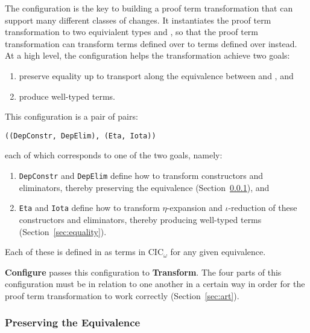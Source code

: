 The configuration is the key to building a proof term transformation that can support many different classes of changes.
It instantiates the proof term transformation to two equivialent types \A and \B, so that the proof term transformation
can transform terms defined over \A to terms defined over \B instead.
At a high level, the configuration helps the transformation achieve two goals:

\begin{enumerate}
\item preserve equality up to transport along the equivalence between \A and \B, and
\item produce well-typed terms.
\end{enumerate}
This configuration is a pair of pairs:

\begin{lstlisting}
((DepConstr, DepElim), (Eta, Iota))
\end{lstlisting}
each of which corresponds to one of the two goals, namely:

\begin{enumerate}
\item \lstinline{DepConstr} and \lstinline{DepElim} define how to transform constructors and eliminators, thereby preserving the equivalence (Section~\ref{sec:equivalence}), and 
\item \lstinline{Eta} and \lstinline{Iota} define how to transform $\eta$-expansion and $\iota$-reduction of these constructors and eliminators, thereby producing well-typed terms (Section~\ref{sec:equality}).
\end{enumerate}
Each of these is defined in as terms in CIC$_{\omega}$ for any given equivalence.

\textbf{Configure} passes this configuration to \textbf{Transform}.
The four parts of this configuration must be in relation to one another in a certain way in order for the proof
term transformation to work correctly (Section~\ref{sec:art}).

\subsubsection{Preserving the Equivalence}
\label{sec:equivalence}

